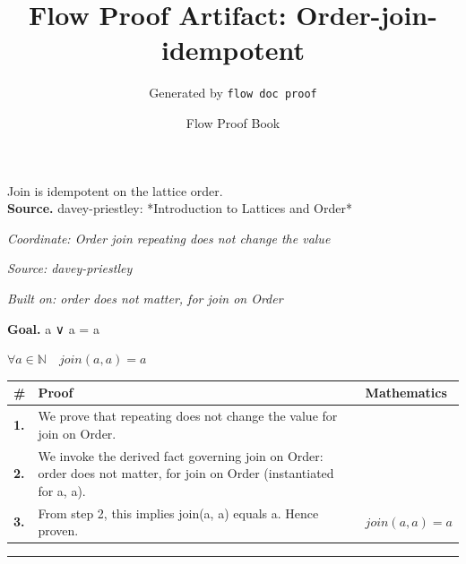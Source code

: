 \documentclass[11pt]{article}
\title{Flow Proof Artifact: Order-join-idempotent}
\author{Generated by \texttt{flow doc proof}}
\date{Flow Proof Book}
\theoremstyle{definition}
\begin{document}
\maketitle
Join is idempotent on the lattice order.\\[0.5em]
\textbf{Source.} davey-priestley: *Introduction to Lattices and Order*\\[0.5em]
\bigskip
{}\par
\smallskip\noindent\textit{Coordinate: Order \cdot join \cdot repeating does not change the value}\par
\smallskip\noindent\textit{Source: davey-priestley}\par
\smallskip\noindent\textit{Built on: order does not matter, for join on Order}\par
\medskip
\noindent\textbf{Goal.} a ∨ a = a\par
\noindent$\displaystyle \forall a \in \mathbb{N}\quad join(a, a) = a$\par
\medskip
\noindent
\begin{tabular}{@{} >{\raggedright\arraybackslash}p{} >{\raggedright\arraybackslash}p{} >{\raggedleft\arraybackslash}p{} @{}}
\textbf{\#} & \textbf{Proof} & \textbf{Mathematics} \\
\midrule
\textbf{1.} & We prove that repeating does not change the value for join on Order. & \\[0.45em]
\textbf{2.} & We invoke the derived fact governing join on Order: order does not matter, for join on Order (instantiated for a, a). & \\[0.45em]
\textbf{3.} & From step 2, this implies join(a, a) equals a. Hence proven. & $\displaystyle join(a, a) = a$ \\[0.45em]
\bottomrule
\end{tabular}
\label{thm:Order-join-repeating_does_not_change_the_value}
\par\medskip\hrule
\end{document}
